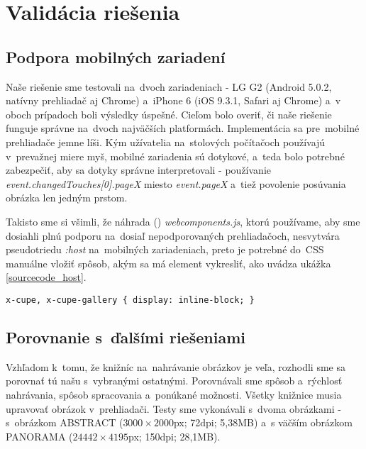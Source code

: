 \chapter{Validácia riešenia}
\section{Podpora mobilných zariadení}

Naše riešenie sme testovali na~dvoch zariadeniach - LG G2 (Android 5.0.2, natívny prehliadač aj Chrome) a~iPhone 6 (iOS 9.3.1, Safari aj Chrome) a~v oboch prípadoch boli výsledky úspešné. Cieľom bolo overiť, či naše riešenie funguje správne na~dvoch najväčších platformách. Implementácia sa pre~mobilné prehliadače jemne líši. Kým užívatelia na~stolových počítačoch používajú v~prevažnej miere myš, mobilné zariadenia sú dotykové, a~teda bolo potrebné zabezpečiť, aby sa dotyky správne interpretovali - používanie \emph{event.changedTouches[0].pageX} miesto \emph{event.pageX} a~tiež povolenie posúvania obrázka len jedným prstom.

Takisto sme si všimli, že náhrada () \emph{webcomponents.js}, ktorú používame, aby sme dosiahli plnú podporu na~dosiaľ nepodporovaných prehliadačoch, nesvytvára pseudotriedu \emph{:host} na~mobilných zariadeniach, preto je potrebné do~CSS manuálne vložiť spôsob, akým sa má element vykresliť, ako uvádza ukážka \ref{sourcecode_host}.

\begin{lstlisting}[label=sourcecode_host,caption=Štýly potrebné pre~správne fungovanie na~mobilných zariadeniach.]
x-cupe, x-cupe-gallery { display: inline-block; }
\end{lstlisting}

\section{Porovnanie s~ďalšími riešeniami}

Vzhľadom k~tomu, že knižníc na~nahrávanie obrázkov je veľa, rozhodli sme sa porovnať tú našu s~vybranými ostatnými. Porovnávali sme spôsob a~rýchlosť nahrávania, spôsob spracovania a~ponúkané možnosti. Všetky knižnice musia upravovať obrázok v~prehliadači.
Testy sme vykonávali s~dvoma obrázkami - s~obrázkom ABSTRACT ($3000\times2000$px; 72dpi; 5,38MB) a~s väčším obrázkom PANORAMA ($24442\times4195$px; 150dpi; 28,1MB).

